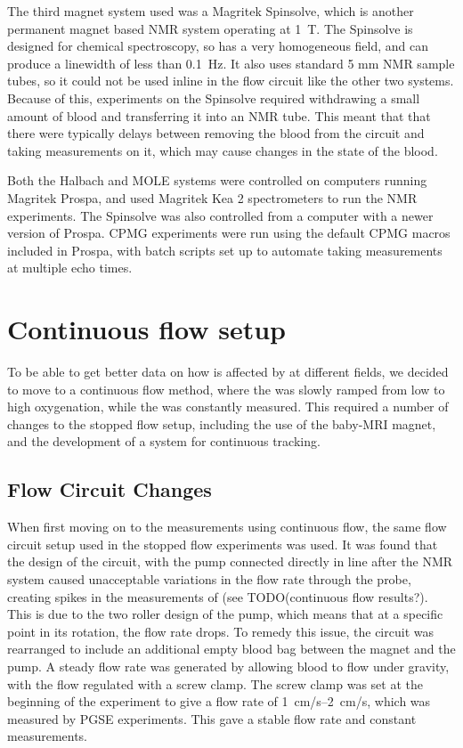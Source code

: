 The third magnet system used was a Magritek Spinsolve, which is another permanent magnet based NMR system operating at \SI{1}{T}.
The Spinsolve is designed for chemical spectroscopy, so has a very homogeneous field, and can produce a linewidth of less than \SI{0.1}{Hz}.
It also uses standard 5 mm NMR sample tubes, so it could not be used inline in the flow circuit like the other two systems.
Because of this, experiments on the Spinsolve required withdrawing a small amount of blood and transferring it into an NMR tube.
This meant that that there were typically delays between removing the blood from the circuit and taking measurements on it, which may cause changes in the state of the blood.

Both the Halbach and MOLE systems were controlled on computers running Magritek Prospa, and used Magritek Kea 2 spectrometers to run the NMR experiments.
The Spinsolve was also controlled from a computer with a newer version of Prospa.
CPMG experiments were run using the default CPMG macros included in Prospa, with batch scripts set up to automate taking measurements at multiple echo times.

\section{Continuous flow setup}
\label{sec:exptsetup-contflow}

To be able to get better data on how \Ttwo is affected by \SOtwo at different fields, we decided to move to a continuous flow method, where the \SOtwo was slowly ramped from low to high oxygenation, while the \Ttwo was constantly measured.
This required a number of changes to the stopped flow setup, including the use of the baby-MRI magnet, and the development of a system for continuous \SOtwo tracking.

\subsection{Flow Circuit Changes}
When first moving on to the measurements using continuous flow, the same flow circuit setup used in the stopped flow experiments was used.
It was found that the design of the circuit, with the pump connected directly in line after the NMR system caused unacceptable variations in the flow rate through the probe, creating spikes in the measurements of \Ttwo (see TODO(continuous flow results?).
This is due to the two roller design of the pump, which means that at a specific point in its rotation, the flow rate drops.
To remedy this issue, the circuit was rearranged to include an additional empty blood bag between the magnet and the pump.
A steady flow rate was generated by allowing blood to flow under gravity, with the flow regulated with a screw clamp.
The screw clamp was set at the beginning of the experiment to give a flow rate of \SIrange{1}{2}{cm/s}, which was measured by PGSE experiments.
This gave a stable flow rate and constant \Ttwo measurements.

